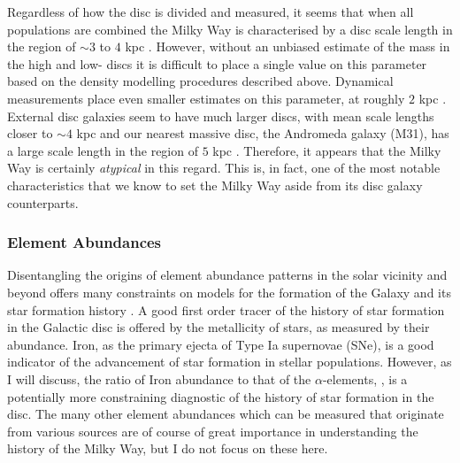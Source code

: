 Regardless of how the disc is divided and measured, it seems that when all populations are combined the Milky Way is characterised by a disc scale length in the region of $\sim 3$ to $4$ kpc \citep{2008ApJ...673..864J}. However, without an unbiased estimate of the mass in the high and low-\afe{} discs it is difficult to place a single value on this parameter based on the density modelling procedures described above. Dynamical measurements place even smaller estimates on this parameter, at roughly $2$ kpc \citep{2013ApJ...779..115B}. External disc galaxies seem to have much larger discs, with mean scale lengths closer to $\sim 4$ kpc \citep[e.g.][]{2010MNRAS.406.1595F} and our nearest massive disc, the Andromeda galaxy (M31), has a large scale length in the region of $5$ kpc \citep[e.g.][]{2011ApJ...739...20C}. Therefore, it appears that the Milky Way is certainly \emph{atypical} in this regard. This is, in fact, one of the most notable characteristics that we know to set the Milky Way aside from its disc galaxy counterparts.

\subsubsection{Element Abundances}
\label{sec:discabundances}
Disentangling the origins of element abundance patterns in the solar vicinity and beyond offers many constraints on models for the formation of the Galaxy and its star formation history \citep[seminal reviews on the goals of this effort are given by][]{1997ARA&A..35..503M,2002ARA&A..40..487F}. A good first order tracer of the history of star formation in the Galactic disc is offered by the metallicity of stars, as measured by their \feh{} abundance. Iron, as the primary ejecta of Type Ia supernovae (SNe), is a good indicator of the advancement of star formation in stellar populations. However, as I will discuss, the ratio of Iron abundance to that of the $\alpha$-elements, \afe{}, is a potentially more constraining diagnostic of the history of star formation in the disc. The many other element abundances which can be measured that originate from various sources are of course of great importance in understanding the history of the Milky Way, but I do not focus on these here.


